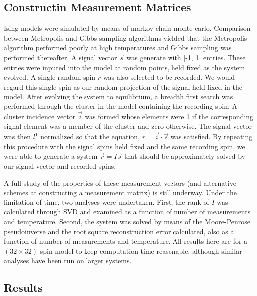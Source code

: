 \documentclass{article} %
\begin{document}
\subsection{Constructin Measurement Matrices}
Ising models were simulated by means of markov chain monte carlo.
\cite{MacKay2003}\cite{Schroeder1999} Comparison
between Metropolis and Gibbs sampling algorithms yielded that the Metropolis
algorithm performed poorly at high temperatures and Gibbs sampling was
performed thereafter.  A signal vector $\vec{s}$ was generate with [-1, 1] entries. These
entries were inputed into the model at random points, held fixed as the system
evolved. A single random spin $r$ was also selected to be recorded. We would regard
this single spin as our random projection of the signal held fixed in the model.
 After evolving the system to equilibrium, a breadth first search was performed
through the cluster in the model containing the recording spin.  A cluster
incidence vector $\vec{i}$ was formed whose elements were 1 if the corresponding signal
element was a member of the cluster and zero otherwise.  The signal vector was
then $l^1$ normalized so that the equation, $r = \vec{i} \cdot \vec{s}$ was satisfied.  By
repeating this procedure with the signal spins held fixed and the same recording
spin, we were able to generate a system $\vec{r} = I\vec{s}$ that should be approximately
solved by our signal vector and recorded spins.

A full study of the properties of these measurement vectors (and alternative
schemes at constructing a measurement matrix) is still underway.  Under the
limitation of time, two analyses were undertaken.  First, the rank of $I$ was
calculated through SVD and examined as a function of number of measurements and
temperature. Second, the
system was solved by means of the Moore-Penrose pseudoinverse and the root square
reconstruction error calculated, also as a function of number of measurements and temperature.
All results here are for a $(32\times 32)$ spin model to keep computation time
reasonable, although similar analyses have been run on larger systems.

\subsection{Results}
\end{document}
